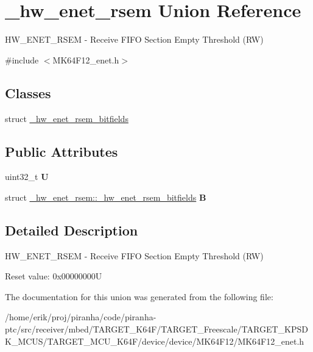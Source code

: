 \hypertarget{union__hw__enet__rsem}{}\section{\+\_\+hw\+\_\+enet\+\_\+rsem Union Reference}
\label{union__hw__enet__rsem}


H\+W\+\_\+\+E\+N\+E\+T\+\_\+\+R\+S\+EM -\/ Receive F\+I\+FO Section Empty Threshold (RW)  




{\ttfamily \#include $<$M\+K64\+F12\+\_\+enet.\+h$>$}

\subsection*{Classes}
\begin{DoxyCompactItemize}
\item 
struct \hyperlink{struct__hw__enet__rsem_1_1__hw__enet__rsem__bitfields}{\+\_\+hw\+\_\+enet\+\_\+rsem\+\_\+bitfields}
\end{DoxyCompactItemize}
\subsection*{Public Attributes}
\begin{DoxyCompactItemize}
\item 
uint32\+\_\+t {\bfseries U}\hypertarget{union__hw__enet__rsem_a27ccbda5081e85b6b893fa061b8bb033}{}\label{union__hw__enet__rsem_a27ccbda5081e85b6b893fa061b8bb033}

\item 
struct \hyperlink{struct__hw__enet__rsem_1_1__hw__enet__rsem__bitfields}{\+\_\+hw\+\_\+enet\+\_\+rsem\+::\+\_\+hw\+\_\+enet\+\_\+rsem\+\_\+bitfields} {\bfseries B}\hypertarget{union__hw__enet__rsem_a11a9312da1a36af10fa1cee878a3a38d}{}\label{union__hw__enet__rsem_a11a9312da1a36af10fa1cee878a3a38d}

\end{DoxyCompactItemize}


\subsection{Detailed Description}
H\+W\+\_\+\+E\+N\+E\+T\+\_\+\+R\+S\+EM -\/ Receive F\+I\+FO Section Empty Threshold (RW) 

Reset value\+: 0x00000000U 

The documentation for this union was generated from the following file\+:\begin{DoxyCompactItemize}
\item 
/home/erik/proj/piranha/code/piranha-\/ptc/src/receiver/mbed/\+T\+A\+R\+G\+E\+T\+\_\+\+K64\+F/\+T\+A\+R\+G\+E\+T\+\_\+\+Freescale/\+T\+A\+R\+G\+E\+T\+\_\+\+K\+P\+S\+D\+K\+\_\+\+M\+C\+U\+S/\+T\+A\+R\+G\+E\+T\+\_\+\+M\+C\+U\+\_\+\+K64\+F/device/device/\+M\+K64\+F12/M\+K64\+F12\+\_\+enet.\+h\end{DoxyCompactItemize}
